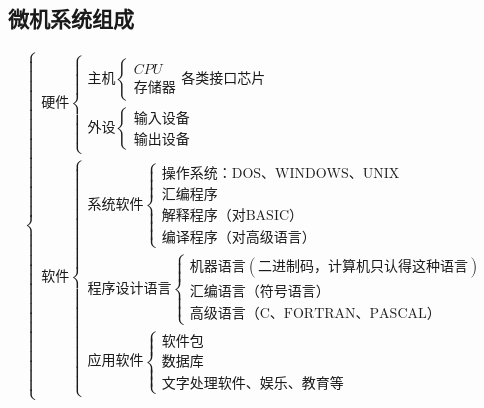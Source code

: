 \subsection{微机系统组成}
\begin{equation}
    \begin{cases}
        \text{硬件}
        \begin{cases}
            \text{主机}
            \begin{cases}
                CPU\\
                \text{存储器}
            \end{cases}
            \text{各类接口芯片}\\
            \text{外设}
            \begin{cases}
                \text{输入设备}\\
                \text{输出设备}
            \end{cases}
        \end{cases}\\
        \text{软件}
        \begin{cases}
            \text{系统软件}
            \begin{cases}
                \text{操作系统：DOS、WINDOWS、UNIX}\\
                \text{汇编程序}\\
                \text{解释程序（对BASIC）}\\
                \text{编译程序（对高级语言）}
            \end{cases}\\
            \text{程序设计语言}
            \begin{cases}
                \text{机器语言}(\text{二进制码，计算机只认得这种语言})\\
                \text{汇编语言（符号语言）}\\
                \text{高级语言（C、FORTRAN、PASCAL）}
            \end{cases}\\
            \text{应用软件}
            \begin{cases}
                \text{软件包}\\
                \text{数据库}\\
                \text{文字处理软件、娱乐、教育等}
            \end{cases}
        \end{cases}
    \end{cases}
\end{equation}
